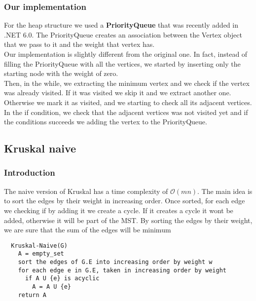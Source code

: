 \subsubsection{Our implementation}
For the heap structure we used a \textbf{PriorityQueue} that was recently added in .NET 6.0.
The PriorityQueue creates an association between the Vertex object that we pass to it and the weight that vertex has.\\
Our implementation is slightly different from the original one. In fact, instead of filling the PriorityQueue with 
all the vertices, we started by inserting only the starting node with the weight of zero.\\
Then, in the while, we extracting the minimum vertex and we check if the vertex was already visited.
If it was visited we skip it and we extract another one.
Otherwise we mark it as visited, and we starting to check all its adjacent vertices.
In the if condition, we check that the adjacent vertices was not visited yet and if the conditions succeeds 
we adding the vertex to the PriorityQueue.

\subsection{Kruskal naive}
\subsubsection{Introduction}
The naive version of Kruskal has a time complexity of $\mathcal{O}(mn)$. The main idea is to sort the edges by 
their weight in increasing order.
Once sorted, for each edge we checking if by adding it we create a cycle. If it creates a cycle it wont be 
added, otherwise it will be part of the MST. By sorting the edges by their weight, we are sure that the sum of the
edges will be minimum
\begin{verbatim}
  Kruskal-Naive(G)
    A = empty_set
    sort the edges of G.E into increasing order by weight w
    for each edge e in G.E, taken in increasing order by weight
      if A U {e} is acyclic
        A = A U {e}
    return A
\end{verbatim}

